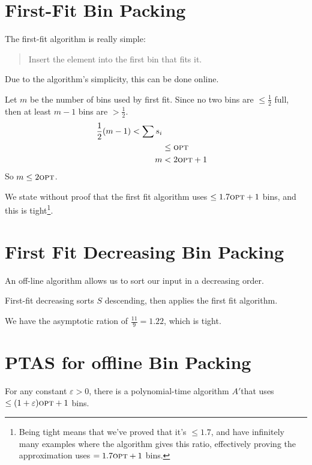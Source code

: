             \section{First-Fit Bin Packing} %
            \label{sec:first_fit_bin_packing}
                The first-fit algorithm is really simple:
                \begin{quote}
                    Insert the element into the first bin that fits it.
                \end{quote}
                Due to the algorithm's simplicity, this can be done online.

                Let $m$ be the number of bins used by first fit.
                Since no two bins are $\le \frac{1}{2}$ full, then at least $m - 1$ bins are $> \frac{1}{2}$.
                \begin{align*}
                    \frac{1}{2} (m-1) < \sum s_i \\
                    &\le \textsc{opt} \\
                    m &< 2\textsc{opt} + 1
                \end{align*}
                So $m \le 2 \textsc{opt}$.

                We state without proof that the first fit algorithm uses $\le 1.7 \textsc{opt} + 1$ bins, and this is tight\footnote{Being tight means that we've proved that it's $\le1.7$, and have infinitely many examples where the algorithm gives this ratio, effectively proving the approximation uses $= 1.7\textsc{opt} + 1$ bins.}.
            \section{First Fit Decreasing Bin Packing} %
            \label{sec:first_fit_decreasing_bin_packing}
                An off-line algorithm allows us to sort our input in a decreasing order.

                First-fit decreasing sorts $S$ descending, then applies the first fit algorithm.

                We have the asymptotic ration of $\frac{11}{9} = 1.22$, which is tight.
            \section{PTAS for offline Bin Packing} %
            \label{sec:ptas_for_offline_bin_packing}
                For any constant $\varepsilon > 0$, there is a polynomial-time algorithm $A'$that uses $\le (1 + \varepsilon)\textsc{opt} + 1$ bins.

